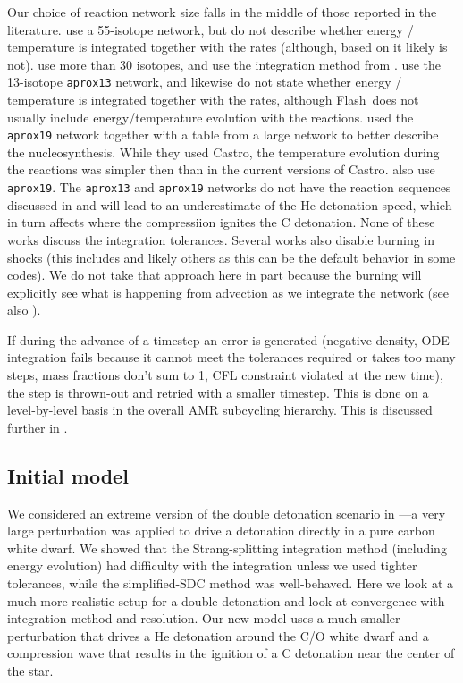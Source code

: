 \documentclass[preprint,linenumbers]{aastex631}
\newcommand{\castro}{{\sf Castro}}
\newcommand{\flash}{{\sf Flash}}
\begin{document}
Our choice of reaction network size falls in the middle of those reported in the literature.  \citet{townsley:2019,boos:2021} use a 55-isotope network, but do not describe whether energy / temperature is integrated together with the rates (although, based on \citealt{townsley:2016} it likely is not). 
\citet{gronow:2020,gronow:2021} use more than 30 isotopes, and use the integration method from \citet{pakmor:2012}. 
\citet{rivas:2022} use the 13-isotope {\tt aprox13} network, and likewise do not state whether energy / temperature is integrated together with the rates, although \flash\ does not usually include energy/temperature evolution with the reactions.
\citet{mollwoosley:2013} used the {\tt aprox19} network together with a table from a large network to better describe the nucleosynthesis.   While they used \castro,
the temperature evolution during the reactions was simpler then than in the current versions of \castro.  \cite{roy:2022} also use {\tt aprox19}.  
The {\tt aprox13} and {\tt aprox19} networks do not have the reaction sequences discussed in \citet{shenbildsten} and will lead to an underestimate of the He detonation speed, which in turn affects
where the compressiion ignites the C detonation.
None of these works discuss the integration tolerances.  Several works also disable burning in shocks (this includes \citealt{kushnirkatz:2020,gronow:2020,gronow:2021,rivas:2022} and likely others as this can be the default behavior in some codes).  We do not take that approach here in part because the burning will explicitly see what is happening from advection as we integrate the network (see also \citealt{papatheodore:2014}).

If during the advance of a timestep an
error is generated (negative density, ODE integration fails because it cannot meet the tolerances required or takes too many steps, mass
fractions don't sum to 1, CFL constraint violated at the new time),
the step is thrown-out and retried with a smaller timestep.  This is
done on a level-by-level basis in the overall AMR subcycling
hierarchy.  This is discussed further in \citet{castro_simple_sdc}.

\subsection{Initial model}

We considered an extreme version of the double detonation scenario in
\citet{castro_simple_sdc}---a very large perturbation was applied to
drive a detonation directly in a pure carbon
white dwarf.  We showed that the Strang-splitting integration method (including energy evolution) had
difficulty with the integration unless we used tighter tolerances,
while the simplified-SDC method was well-behaved.  Here we look at a
much more realistic setup for a double detonation
and look at convergence with integration method and resolution.  Our new model uses a much smaller
perturbation that drives a He detonation around the C/O white dwarf and a
compression wave that results in the ignition of a C detonation near
the center of the star.  
\end{document}
